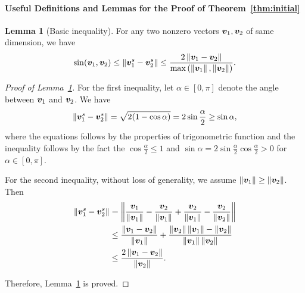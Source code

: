 \documentclass[lettersize,journal]{IEEEtran}
\theoremstyle{definition}
\newtheorem{lem}{Lemma}
\theoremstyle{definition}
\begin{document}
\paragraph{Useful Definitions and Lemmas for the Proof of Theorem~\ref{thm:initial}} 
\begin{lem}[Basic inequality]\label{lem:norm_diff} For any two nonzero vectors $\bm{v}_1,\bm{v}_2$ of same dimension, we have 
\[
\sin(\bm{v}_1 , \bm{v}_2) \leq \left\lVert{\bm{v}_1^s}-{\bm{v}_2^s}\right\rVert\leq {2\left\lVert\bm{v}_1-\bm{v}_2\right\rVert\over \max\left(\left\lVert\bm{v}_1\right\rVert,\left\lVert\bm{v}_2\right\rVert\right)}.
\]
\end{lem}
\begin{proof}[Proof of Lemma~\ref{lem:norm_diff}]
For the first inequality, let $\alpha \in [0,\pi]$ denote the angle between $\bm{v}_1$ and $\bm{v}_2$. We have 
\begin{align}
     \left\lVert{\bm{v}_1^s}-{\bm{v}_2^s}\right\rVert = \sqrt{2(1 - \cos \alpha)} = 2 \sin \frac{\alpha}{2} \geq \sin \alpha,
\end{align}
where the equations follows by the properties of trigonometric function and the inequality follows by the fact the $\cos \frac{\alpha}{2} \leq 1$ and $\sin \alpha = 2 \sin \frac{\alpha}{2} \cos \frac{\alpha}{2} > 0$ for $\alpha \in [0, \pi]$. 

For the second inequality, without loss of generality, we assume $\left\lVert\bm{v}_1\right\rVert\geq \left\lVert\bm{v}_2\right\rVert$. Then
\begin{align}
\left\lVert{\bm{v}_1^s}-{\bm{v}_2^s}\right\rVert&=\left\lVert{\bm{v}_1\over \left\lVert\bm{v}_1\right\rVert}- {\bm{v}_2\over \left\lVert\bm{v}_1\right\rVert}+{\bm{v}_2\over \left\lVert\bm{v}_1\right\rVert}-{\bm{v}_2\over \left\lVert\bm{v}_2\right\rVert}\right\rVert\\
&\leq {\left\lVert\bm{v}_1-\bm{v}_2\right\rVert\over \left\lVert\bm{v}_1\right\rVert}+{\left\lVert\bm{v}_2\right\rVert\left\lVert\bm{v}_1\right\rVert-\left\lVert\bm{v}_2\right\rVert\over \left\lVert\bm{v}_1\right\rVert\left\lVert\bm{v}_2\right\rVert}\\
&\leq {2\left\lVert\bm{v}_1-\bm{v}_2\right\rVert\over \left\lVert\bm{v}_2\right\rVert}.
\end{align}

Therefore, Lemma~\ref{lem:norm_diff} is proved.
\end{proof}
\end{document}
